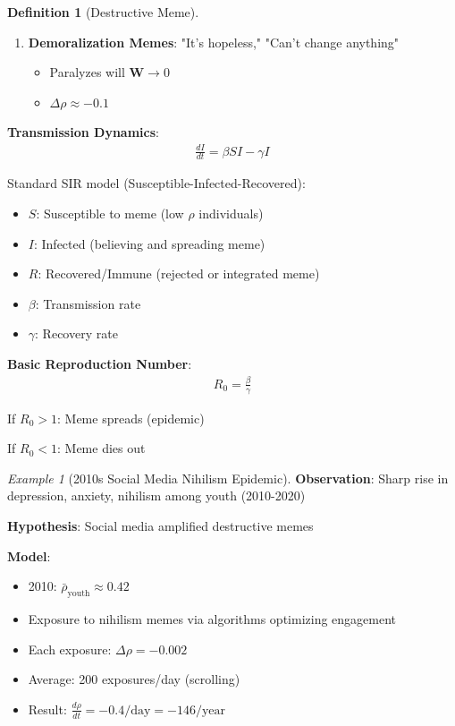 \documentclass[11pt,a4paper]{article}
\theoremstyle{definition}
\newtheorem{definition}{Definition}[section]
\theoremstyle{remark}
\newtheorem{example}{Example}[section]
\newcommand{\WW}{\mathbf{W}}
\begin{document}
\begin{small}
\begin{enumerate}
\begin{definition}[Destructive Meme]
\begin{enumerate}
    \item \textbf{Demoralization Memes}: "It's hopeless," "Can't change anything"
        \begin{itemize}
            \item Paralyzes will \(\WW \to 0\)
            \item \(\Delta\rho \approx -0.1\)
        \end{itemize}
\end{enumerate}

\textbf{Transmission Dynamics}:
\begin{align}
\frac{dI}{dt} = \beta S I - \gamma I
\end{align}

Standard SIR model (Susceptible-Infected-Recovered):
\begin{itemize}
    \item \(S\): Susceptible to meme (low \(\rho\) individuals)
    \item \(I\): Infected (believing and spreading meme)
    \item \(R\): Recovered/Immune (rejected or integrated meme)
    \item \(\beta\): Transmission rate
    \item \(\gamma\): Recovery rate
\end{itemize}

\textbf{Basic Reproduction Number}:
\begin{align}
R_0 = \frac{\beta}{\gamma}
\end{align}

If \(R_0 > 1\): Meme spreads (epidemic)

If \(R_0 < 1\): Meme dies out
\end{definition}

\begin{example}[2010s Social Media Nihilism Epidemic]
\textbf{Observation}: Sharp rise in depression, anxiety, nihilism among youth (2010-2020)

\textbf{Hypothesis}: Social media amplified destructive memes

\textbf{Model}:
\begin{itemize}
    \item 2010: \(\bar{\rho}_{\text{youth}} \approx 0.42\)
    \item Exposure to nihilism memes via algorithms optimizing engagement
    \item Each exposure: \(\Delta\rho = -0.002\)
    \item Average: 200 exposures/day (scrolling)
    \item Result: \(\frac{d\rho}{dt} = -0.4/\text{day} = -146/\text{year}\)
\end{itemize}


\end{example}
\end{enumerate}
\end{small}
\end{document}
